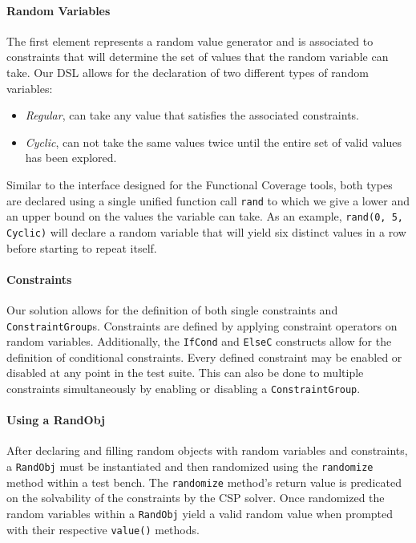 \documentclass[conference]{IEEEtran}
\begin{document}
\paragraph{Random Variables} The first element represents a random value generator and is associated to constraints that will determine the set of values that the random variable can take.
Our DSL allows for the declaration of two different types of random variables: 
\begin{itemize}
	\item \emph{Regular}, can take any value that satisfies the associated constraints.
	\item \emph{Cyclic}, can not take the same values twice until the entire set of valid values has been explored.
\end{itemize}
Similar to the interface designed for the Functional Coverage tools, both types are declared using a single unified function call \texttt{rand} to which we give a lower and an upper bound on the values the variable can take.
As an example, \texttt{rand(0, 5, Cyclic)} will declare a random variable that will yield six distinct values in a row before starting to repeat itself.

\paragraph{Constraints} Our solution allows for the definition of both single constraints and \texttt{ConstraintGroup}s. 
Constraints are defined by applying constraint operators on random variables.
Additionally, the \texttt{IfCond} and \texttt{ElseC} constructs allow for the definition of conditional constraints.
Every defined constraint may be enabled or disabled at any point in the test suite. 
This can also be done to multiple constraints simultaneously by enabling or disabling a  \texttt{ConstraintGroup}.

\paragraph{Using a RandObj} After declaring and filling random objects with random variables and constraints, a \texttt{RandObj} must be instantiated and then randomized using the \texttt{randomize} method within a test bench.
The \texttt{randomize} method's return value is predicated on the solvability of the constraints by the CSP solver. 
Once randomized the random variables within a \texttt{RandObj} yield a valid random value when prompted with their respective \texttt{value()} methods.
\end{document}
